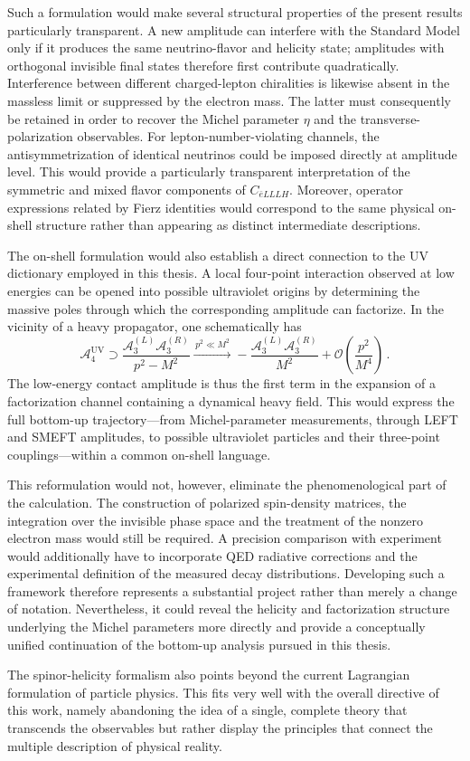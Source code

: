 Such a formulation would make several structural properties of the present
results particularly transparent. A new amplitude can interfere with the
Standard Model only if it produces the same neutrino-flavor and helicity state;
amplitudes with orthogonal invisible final states therefore first contribute
quadratically. Interference between different charged-lepton chiralities is
likewise absent in the massless limit or suppressed by the electron mass. The
latter must consequently be retained in order to recover the Michel parameter
$\eta$ and the transverse-polarization observables. For lepton-number-violating
channels, the antisymmetrization of identical neutrinos could be imposed
directly at amplitude level. This would provide a particularly transparent
interpretation of the symmetric and mixed flavor components of
$C_{\bar e LLLH}$. Moreover, operator expressions related by Fierz identities
would correspond to the same physical on-shell structure rather than appearing
as distinct intermediate descriptions.

The on-shell formulation would also establish a direct connection to the UV
dictionary employed in this thesis. A local four-point interaction observed at
low energies can be opened into possible ultraviolet origins by determining
the massive poles through which the corresponding amplitude can factorize. In
the vicinity of a heavy propagator, one schematically has
\begin{equation}
    \mathcal A_4^{\mathrm{UV}}
    \supset
    \frac{\mathcal A_3^{(L)}\mathcal A_3^{(R)}}{p^2-M^2}
    \xrightarrow{\,p^2\ll M^2\,}
    -\frac{\mathcal A_3^{(L)}\mathcal A_3^{(R)}}{M^2}
    +\mathcal O\!\left(\frac{p^2}{M^4}\right)\,.
    \label{eq:outlook-onshell-factorization}
\end{equation}
The low-energy contact amplitude is thus the first term in the expansion of a
factorization channel containing a dynamical heavy field. This would express
the full bottom-up trajectory---from Michel-parameter measurements, through
LEFT and SMEFT amplitudes, to possible ultraviolet particles and their
three-point couplings---within a common on-shell language.

This reformulation would not, however, eliminate the phenomenological part of
the calculation. The construction of polarized spin-density matrices, the
integration over the invisible phase space and the treatment of the nonzero
electron mass would still be required. A precision comparison with experiment
would additionally have to incorporate QED radiative corrections and the
experimental definition of the measured decay distributions. Developing such
a framework therefore represents a substantial project rather than merely a
change of notation. Nevertheless, it could reveal the helicity and
factorization structure underlying the Michel parameters more directly and
provide a conceptually unified continuation of the bottom-up analysis pursued
in this thesis.

The spinor-helicity formalism also points beyond the current Lagrangian formulation of particle physics. This fits very well with the overall directive of this work, namely abandoning the idea of a single, complete theory that transcends the observables but rather display the principles that connect the multiple description of physical reality.